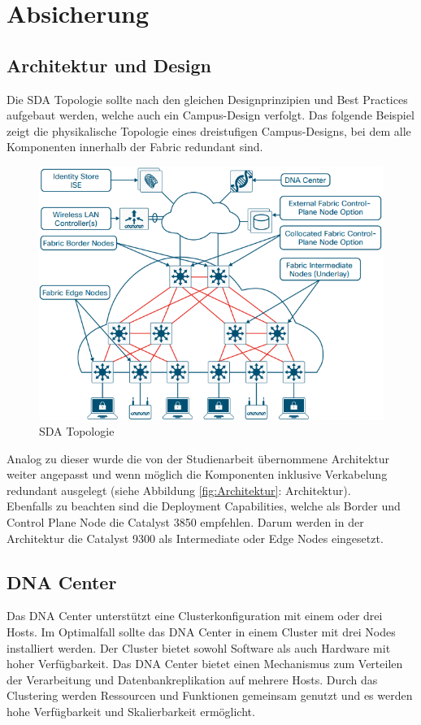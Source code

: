 \section{Absicherung}

\subsection{Architektur und Design}
Die SDA Topologie sollte nach den gleichen Designprinzipien und Best Practices aufgebaut werden, welche auch ein Campus-Design verfolgt. Das folgende Beispiel zeigt die physikalische Topologie eines dreistufigen Campus-Designs, bei dem alle Komponenten innerhalb der Fabric redundant sind.

\begin{figure}[H]
	\centering
	\includegraphics[width=0.8\linewidth]{img/Absicherung/SDA-Architektur}
	\caption{SDA Topologie \cite{sda-designguide-sept2018} }
	\label{fig:SDA Topologie}
\end{figure}

Analog zu dieser wurde die von der Studienarbeit übernommene Architektur weiter angepasst und wenn möglich die Komponenten inklusive Verkabelung redundant ausgelegt (siehe Abbildung \ref{fig:Architektur}: Architektur). \\

Ebenfalls zu beachten sind die Deployment Capabilities, welche als Border und Control Plane Node die Catalyst 3850 empfehlen. Darum werden in der Architektur die Catalyst 9300 als Intermediate oder Edge Nodes eingesetzt.

\subsection{DNA Center}
Das DNA Center unterstützt eine Clusterkonfiguration mit einem oder drei Hosts. Im Optimalfall sollte das DNA Center in einem Cluster mit drei Nodes installiert werden. Der Cluster bietet sowohl Software als auch Hardware mit hoher Verfügbarkeit. Das DNA Center bietet einen Mechanismus zum Verteilen der Verarbeitung und Datenbankreplikation auf mehrere Hosts. Durch das Clustering werden Ressourcen und Funktionen gemeinsam genutzt und es werden hohe Verfügbarkeit und Skalierbarkeit ermöglicht. \\

